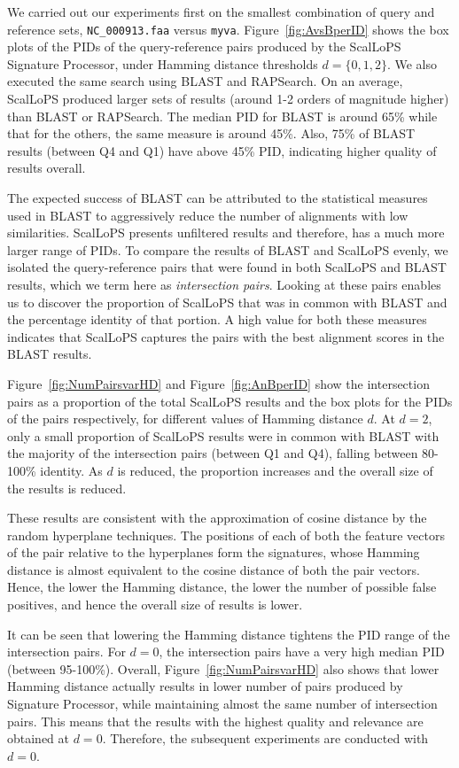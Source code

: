 \documentclass[titlepage]{csetr}
\begin{document}
We carried out our experiments first on the smallest combination of query and reference sets, \texttt{NC\_000913.faa} versus \texttt{myva}. Figure~\ref{fig:AvsBperID} shows the box plots of the PIDs of the query-reference pairs produced by the ScalLoPS Signature Processor, under Hamming distance thresholds $d = \{0, 1, 2\}$. We also executed the same search using BLAST and RAPSearch. On an average, ScalLoPS produced larger sets of results (around 1-2 orders of magnitude higher) than BLAST or RAPSearch. The median PID for BLAST is around 65\% while that for the others, the same measure is around 45\%. Also, 75\% of BLAST results (between Q4 and Q1) have above 45\% PID, indicating higher quality of results overall. 

The expected success of BLAST can be attributed to the statistical measures used in BLAST to aggressively reduce the number of alignments with low similarities. ScalLoPS presents unfiltered results and therefore, has a much more larger range of PIDs. To compare the results of BLAST and ScalLoPS evenly, we isolated the query-reference pairs that were found in both ScalLoPS and BLAST results, which we term here as \emph{intersection pairs}. Looking at these pairs enables us to discover the proportion of ScalLoPS that was in common with BLAST and the percentage identity of that portion. A high value for both these measures indicates that ScalLoPS captures the pairs with the best alignment scores in the BLAST results.  


Figure~\ref{fig:NumPairsvarHD} and Figure~\ref{fig:AnBperID} show the intersection pairs as a proportion of the total ScalLoPS results and the box plots for the PIDs of the pairs respectively, for different values of Hamming distance $d$. At $d = 2$, only a small proportion of ScalLoPS results were in common with BLAST with the majority of the intersection pairs (between Q1 and Q4), falling between 80-100\% identity. As $d$ is reduced, the proportion increases and the overall size of the results is reduced. 

These results are consistent with the approximation of cosine distance by the random hyperplane techniques. The positions of each of both the feature vectors of the pair relative to the hyperplanes form the signatures, whose Hamming distance is almost equivalent to the cosine distance of both the pair vectors. Hence, the lower the Hamming distance, the lower the number of possible false positives, and hence the overall size of results is lower. 

It can be seen that lowering the Hamming distance tightens the PID range of the intersection pairs. For $d=0$, the intersection pairs have a very high median PID (between 95-100\%). Overall, Figure~\ref{fig:NumPairsvarHD} also shows that lower Hamming distance actually results in lower number of pairs produced by Signature Processor, while maintaining almost the same number of intersection pairs. This means that the results with the highest quality and relevance are obtained at $d=0$. Therefore, the subsequent experiments are conducted with $d=0$.
 
\end{document}
